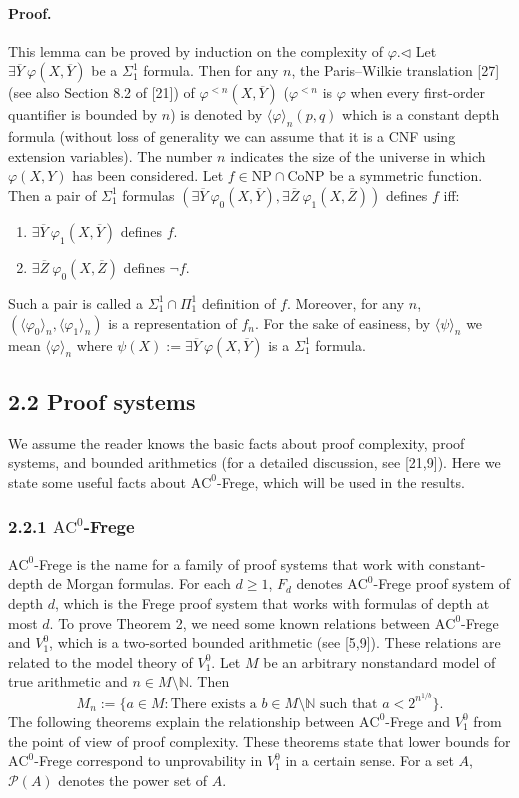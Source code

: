 \documentclass[10pt,a4paper]{article}
\begin{document}
\paragraph{Proof.} This lemma can be proved by induction on the complexity of $\varphi$.\hfill$\triangleleft$
Let $\exists\overline Y\ \varphi(X,\overline Y)$ be a $\Sigma_1^1$ formula. Then for any $n$, the Paris–Wilkie translation [27] (see also Section 8.2 of [21]) of $\varphi^{<n}(X,\overline Y)$ ($\varphi^{<n}$ is $\varphi$ when every first-order quantifier is bounded by $n$) is denoted by $\langle\varphi\rangle_n(p,q)$ which is a constant depth formula (without loss of generality we can assume that it is a CNF using extension variables). The number $n$ indicates the size of the universe in which $\varphi(X,Y)$ has been considered.
Let $f\in\mathrm{NP}\cap\mathrm{CoNP}$ be a symmetric function. Then a pair of $\Sigma_1^1$ formulas $(\exists\overline Y\ \varphi_0(X,\overline Y),\exists\overline Z\ \varphi_1(X,\overline Z))$ defines $f$ iff:
\begin{enumerate}
\item $\exists\overline Y\ \varphi_1(X,\overline Y)$ defines $f$.
\item $\exists\overline Z\ \varphi_0(X,\overline Z)$ defines $\neg f$.
\end{enumerate}
Such a pair is called a $\Sigma_1^1\cap\Pi_1^1$ definition of $f$. Moreover, for any $n$, $(\langle\varphi_0\rangle_n,\langle\varphi_1\rangle_n)$ is a representation of $f_n$. For the sake of easiness, by $\langle\psi\rangle_n$ we mean $\langle\varphi\rangle_n$ where $\psi(X):=\exists\overline Y\ \varphi(X,\overline Y)$ is a $\Sigma_1^1$ formula.
\subsection*{2.2 Proof systems}
We assume the reader knows the basic facts about proof complexity, proof systems, and bounded arithmetics (for a detailed discussion, see [21,9]). Here we state some useful facts about $\mathrm{AC}^0$-Frege, which will be used in the results.
\subsubsection*{2.2.1 $\mathrm{AC}^0$-Frege}
$\mathrm{AC}^0$-Frege is the name for a family of proof systems that work with constant-depth de Morgan formulas. For each $d\geq1$, $F_d$ denotes $\mathrm{AC}^0$-Frege proof system of depth $d$, which is the Frege proof system that works with formulas of depth at most $d$.
To prove Theorem 2, we need some known relations between $\mathrm{AC}^0$-Frege and $V_1^0$, which is a two-sorted bounded arithmetic (see [5,9]). These relations are related to the model theory of $V_1^0$.
Let $M$ be an arbitrary nonstandard model of true arithmetic and $n\in M\setminus\mathbb N$. Then
\[M_n:=\{a\in M:\text{There exists a }b\in M\setminus\mathbb N\text{ such that }a<2^{n^{1/b}}\}.\]
The following theorems explain the relationship between $\mathrm{AC}^0$-Frege and $V_1^0$ from the point of view of proof complexity. These theorems state that lower bounds for $\mathrm{AC}^0$-Frege correspond to unprovability in $V_1^0$ in a certain sense.
For a set $A$, $\mathcal P(A)$ denotes the power set of $A$.
\end{document}
